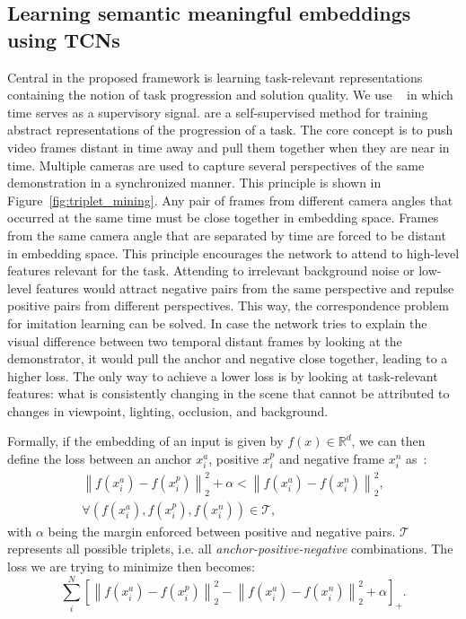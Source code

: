 \documentclass[\home/main.tex]{subfiles}
\begin{document}
\subsection{Learning semantic meaningful embeddings using TCNs}\label{subsec:tcn}
Central in the proposed framework is learning task-relevant representations containing the notion of task progression and solution quality. We use ~\cite{Sermanet2017TCN} in which time serves as a supervisory signal.  are a self-supervised method for training abstract representations of the progression of a task. The core concept is to push video frames distant in time away and pull them together when they are near in time. Multiple cameras are used to capture several perspectives of the same demonstration in a synchronized manner. This principle is shown in Figure~\ref{fig:triplet_mining}. Any pair of frames from different camera angles that occurred at the same time must be close together in embedding space. Frames from the same camera angle that are separated by time are forced to be distant in embedding space. This principle encourages the network to attend to high-level features relevant for the task.
Attending to irrelevant background noise or low-level features would attract negative pairs from the same perspective and repulse positive pairs from different perspectives. This way, the correspondence problem~\cite{BrassHeyes2005} for imitation learning can be solved. In case the network tries to explain the visual difference between two temporal distant frames by looking at the demonstrator, it would pull the anchor and negative close together, leading to a higher loss. The only way to achieve a lower loss is by looking at task-relevant features: what is consistently changing in the scene that cannot be attributed to changes in viewpoint, lighting, occlusion, and background.

Formally, if the embedding of an input is given by $f(x) \in \mathbb{R}^d$, we can then define the loss between an anchor $x_i^a$, positive $x_i^p$ and negative frame $x_i^n$ as~\cite{FaceNet}:
\begin{align}
    \left\|f\left(x_{i}^{a}\right)-f\left(x_{i}^{p}\right)\right\|_{2}^{2}+\alpha<\left\|f\left(x_{i}^{a}\right)-f\left(x_{i}^{n}\right)\right\|_{2}^{2} \nonumber, \\
    \forall\left(f\left(x_{i}^{a}\right), f\left(x_{i}^{p}\right), f\left(x_{i}^{n}\right)\right) \in \mathcal{T},    \nonumber
\end{align}
with $\alpha$ being the margin enforced between positive and negative pairs. $\mathcal{T}$ represents all possible triplets, i.e. all \textit{anchor-positive-negative} combinations. The loss we are trying to minimize then becomes:
\begin{equation*}
    \sum_{i}^{N}\left[\left\|f\left(x_{i}^{a}\right)-f\left(x_{i}^{p}\right)\right\|_{2}^{2}-\left\|f\left(x_{i}^{a}\right)-f\left(x_{i}^{n}\right)\right\|_{2}^{2}+\alpha\right]_{+}.
\end{equation*}
\end{document}
